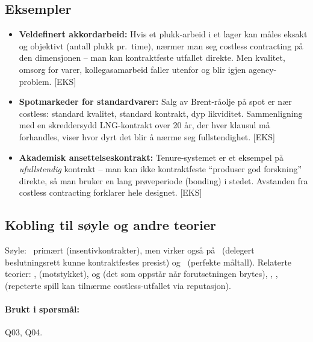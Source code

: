 \subsection*{Eksempler}
\begin{itemize}
\item \textbf{Veldefinert akkord\-arbeid:} Hvis et plukk-arbeid i et lager kan måles eksakt og objektivt (antall plukk pr.\ time), nærmer man seg costless contracting på den dimensjonen -- man kan kontraktfeste utfallet direkte. Men kvalitet, omsorg for varer, kollegasamarbeid faller utenfor og blir igjen agency-problem. [EKS]
\item \textbf{Spotmarkeder for standardvarer:} Salg av Brent-råolje på spot er nær costless: standard kvalitet, standard kontrakt, dyp likviditet. Sammenligning med en skreddersydd LNG-kontrakt over 20 år, der hver klausul må forhandles, viser hvor dyrt det blir å nærme seg fullstendighet. [EKS]
\item \textbf{Akademisk ansettelseskontrakt:} Tenure-systemet er et eksempel på \emph{ufullstendig} kontrakt -- man kan ikke kontraktfeste ``produser god forskning'' direkte, så man bruker en lang prøveperiode (bonding) i stedet. Avstanden fra costless contracting forklarer hele designet. [EKS]
\end{itemize}

\subsection*{Kobling til søyle og andre teorier}
Søyle: \SThree\ primært (insentivkontrakter), men virker også på \SOne\ (delegert beslutningsrett kunne kontraktfestes presist) og \STwo\ (perfekte måltall). Relaterte teorier: ,  (motstykket),  og  (det som oppstår når forutsetningen brytes), , ,  (repeterte spill kan tilnærme costless-utfallet via reputasjon).

\paragraph{Brukt i spørsmål:} Q03, Q04.
